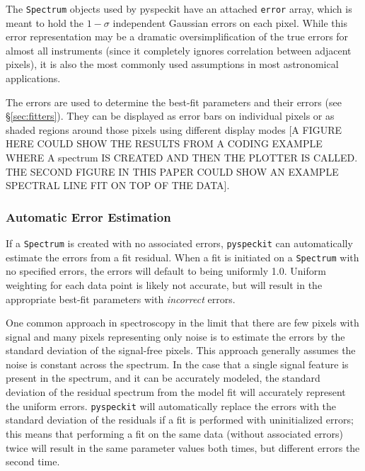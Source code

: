 \documentclass[twocolumn]{aastex61}
\newcommand{\pyspeckit}{\texttt{pyspeckit}\xspace}
\begin{document}


The \texttt{Spectrum} objects used by pyspeckit have an attached \texttt{error}
array, which is meant to hold the $1-\sigma$ independent Gaussian errors on
each pixel.  While this error representation may be a dramatic
oversimplification of the true errors for almost all instruments (since it
completely ignores correlation between adjacent pixels), it is also the most
commonly used assumptions in most astronomical applications.

The errors are used to determine the best-fit parameters and their errors (see
\S \ref{sec:fitters}).  They can be displayed as error bars on individual
pixels or as shaded regions around those pixels using different display modes
[A FIGURE HERE COULD SHOW THE RESULTS FROM A CODING EXAMPLE WHERE A spectrum IS
CREATED AND THEN THE PLOTTER IS CALLED. THE SECOND FIGURE IN THIS PAPER COULD 
SHOW AN EXAMPLE SPECTRAL LINE FIT ON TOP OF THE DATA].

\subsubsection{Automatic Error Estimation}
If a \texttt{Spectrum} is created with no associated errors, \pyspeckit can automatically
estimate the errors from a fit residual. When a fit is initiated on a \texttt{Spectrum}
with no specified errors, the errors will default to being uniformly 1.0. Uniform
weighting for each data point is likely not accurate, but will result in the appropriate 
best-fit parameters with \emph{incorrect} errors.

One common approach in spectroscopy in the limit that there are few pixels with
signal and many pixels representing only noise is to estimate the errors by the
standard deviation of the signal-free pixels.  This approach generally assumes
the noise is constant across the spectrum.  In the case that a single signal
feature is present in the spectrum, and it can be accurately modeled, the
standard deviation of the residual spectrum from the model fit will accurately
represent the uniform errors.  \pyspeckit will automatically replace the errors
with the standard deviation of the residuals if a fit is performed with
uninitialized errors; this means that performing a fit on the same data
(without associated errors) twice will result in the same parameter values both
times, but different errors the second time.
\end{document}

